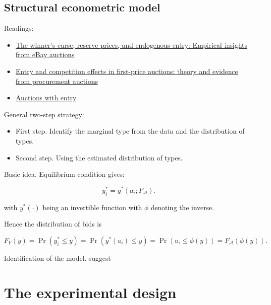 \documentclass[12pt,]{article}
\theoremstyle{plain} %
\begin{document}
\subsection{Structural econometric
model}\label{structural-econometric-model}

Readings:

\begin{itemize}
\item
  \href{http://citeseerx.ist.psu.edu/viewdoc/download?doi=10.1.1.199.680\&rep=rep1\&type=pdf}{The
  winner's curse, reserve prices, and endogenous entry: Empirical
  insights from eBay auctions}
\item
  \href{https://www.econstor.eu/bitstream/10419/79263/1/516364804.pdf}{Entry
  and competition effects in first-price auctions: theory and evidence
  from procurement auctions}
\item
  \href{http://www.vita.mcafee.cc/PDF/AuctionswithEntry.pdf}{Auctions
  with entry}
\end{itemize}

General two-step strategy:

\begin{itemize}
\item
  First step. Identify the marginal type from the data and the
  distribution of types.
\item
  Second step. Using the estimated distribution of types.
\end{itemize}

Basic idea. Equilibrium condition gives:

\begin{equation}
  y_i^* = y^*(a_i; F_{\mathcal{A}}). 
\end{equation}

with \(y^*(\cdot)\) being an invertible function with \(\phi\) denoting
the inverse.

Hence the distribution of bids is

\begin{equation}
F_{Y}(y) = \Pr(y_i^* \leq y) 
        = \Pr(y^*(a_i) \leq y) 
        = \Pr(a_i \leq \phi(y)) 
        = F_\mathcal{A}( \phi(y)).
\end{equation}

Identification of the model. suggest

\section{The experimental design}\label{the-experimental-design}
\end{document}

